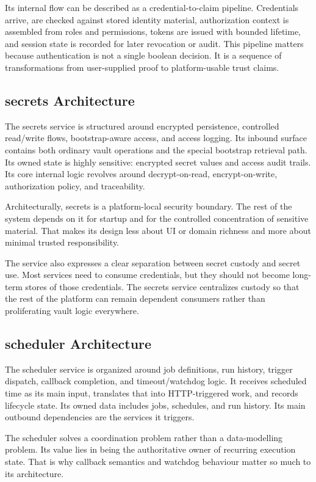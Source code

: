 Its internal flow can be described as a credential-to-claim pipeline. Credentials arrive, are checked against stored identity material, authorization context is assembled from roles and permissions, tokens are issued with bounded lifetime, and session state is recorded for later revocation or audit. This pipeline matters because authentication is not a single boolean decision. It is a sequence of transformations from user-supplied proof to platform-usable trust claims.

\subsection{secrets Architecture}
The secrets service is structured around encrypted persistence, controlled read/write flows, bootstrap-aware access, and access logging. Its inbound surface contains both ordinary vault operations and the special bootstrap retrieval path. Its owned state is highly sensitive: encrypted secret values and access audit trails. Its core internal logic revolves around decrypt-on-read, encrypt-on-write, authorization policy, and traceability.

Architecturally, secrets is a platform-local security boundary. The rest of the system depends on it for startup and for the controlled concentration of sensitive material. That makes its design less about UI or domain richness and more about minimal trusted responsibility.

The service also expresses a clear separation between secret custody and secret use. Most services need to consume credentials, but they should not become long-term stores of those credentials. The secrets service centralizes custody so that the rest of the platform can remain dependent consumers rather than proliferating vault logic everywhere.

\subsection{scheduler Architecture}
The scheduler service is organized around job definitions, run history, trigger dispatch, callback completion, and timeout/watchdog logic. It receives scheduled time as its main input, translates that into HTTP-triggered work, and records lifecycle state. Its owned data includes jobs, schedules, and run history. Its main outbound dependencies are the services it triggers.

The scheduler solves a coordination problem rather than a data-modelling problem. Its value lies in being the authoritative owner of recurring execution state. That is why callback semantics and watchdog behaviour matter so much to its architecture.

